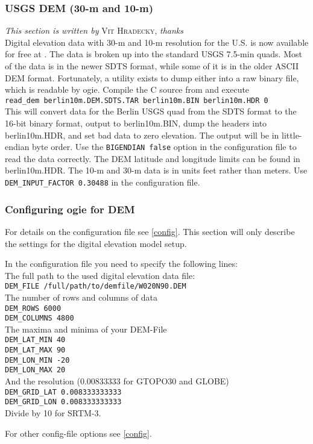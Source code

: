 \subsubsection{USGS DEM (30-m and 10-m)}
\emph{This section is written by} \textsc{Vit Hradecky,} \emph{thanks} \\

Digital elevation data with 30-m and 10-m resolution for the U.S. is
now available for free at \cite{geocomm}.
The data is broken up into the standard USGS 7.5-min quads. Most of the
data is in the newer SDTS format, while some of it is in the older ASCII
DEM format. Fortunately, a utility exists to dump either into a raw
binary file, which is readable by ogie. Compile the C source from
\cite{readdem} and execute \\
\texttt{read\_dem berlin10m.DEM.SDTS.TAR berlin10m.BIN berlin10m.HDR 0} \\
This will convert data for the Berlin USGS quad from the SDTS format to
the 16-bit binary format, output to berlin10m.BIN, dump the headers into
berlin10m.HDR, and set bad data to zero elevation. The output will be in
little-endian byte order. Use the \texttt{BIGENDIAN false} option in the
configuration file to read the data correctly. The DEM latitude and
longitude limits can be found in berlin10m.HDR.
The 10-m and 30-m data is in units feet rather than meters. Use \texttt{DEM\_INPUT\_FACTOR
0.30488} in the configuration file.


\subsubsection{Configuring ogie for DEM}
\label{demconf}

For details on the configuration file see \ref{config}.
This section will only describe the settings for the digital elevation model setup.

In the configuration file you need to specify the following lines: \\
The full path to the used digital elevation data file: \\
\texttt{DEM\_FILE  /full/path/to/demfile/W020N90.DEM} \\

The number of rows and columns of data \\
\texttt{DEM\_ROWS 6000} \\
\texttt{DEM\_COLUMNS 4800} \\

The maxima and minima of your DEM-File \\
\texttt{DEM\_LAT\_MIN 40} \\
\texttt{DEM\_LAT\_MAX 90}\\
\texttt{DEM\_LON\_MIN -20}\\
\texttt{DEM\_LON\_MAX 20}\\

And the resolution (0.00833333 for GTOPO30 and GLOBE)\\
\texttt{DEM\_GRID\_LAT 0.008333333333}\\
\texttt{DEM\_GRID\_LON 0.008333333333}\\
Divide by 10 for SRTM-3.

For other config-file options see \ref{config}.


